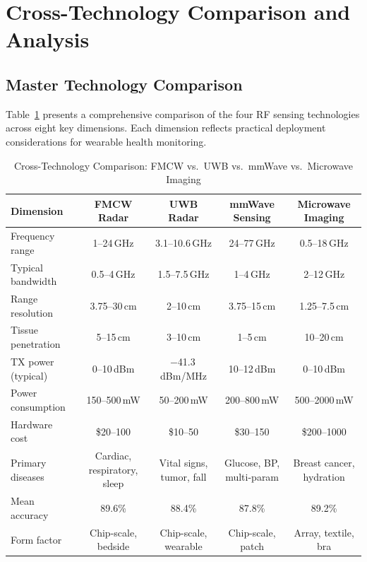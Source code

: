 \documentclass[journal,twoside]{IEEEtran}
\begin{document}
\section{Cross-Technology Comparison and Analysis}

\subsection{Master Technology Comparison}
Table~\ref{tab:master_comparison} presents a comprehensive comparison of the four RF sensing technologies across eight key dimensions. Each dimension reflects practical deployment considerations for wearable health monitoring.

\begin{table}[!t]
\centering
\caption{Cross-Technology Comparison: FMCW vs.\ UWB vs.\ mmWave vs.\ Microwave Imaging}
\label{tab:master_comparison}
\renewcommand{\arraystretch}{1.2}
\footnotesize
\begin{tabular}{lcccc}
\toprule
\textbf{Dimension} & \textbf{FMCW Radar} & \textbf{UWB Radar} & \textbf{mmWave Sensing} & \textbf{Microwave Imaging} \\
\midrule
Frequency range & 1--24\,GHz & 3.1--10.6\,GHz & 24--77\,GHz & 0.5--18\,GHz \\
Typical bandwidth & 0.5--4\,GHz & 1.5--7.5\,GHz & 1--4\,GHz & 2--12\,GHz \\
Range resolution & 3.75--30\,cm & 2--10\,cm & 3.75--15\,cm & 1.25--7.5\,cm \\
Tissue penetration & 5--15\,cm & 3--10\,cm & 1--5\,cm & 10--20\,cm \\
TX power (typical) & 0--10\,dBm & $-$41.3\,dBm/MHz & 10--12\,dBm & 0--10\,dBm \\
Power consumption & 150--500\,mW & 50--200\,mW & 200--800\,mW & 500--2000\,mW \\
Hardware cost & \$20--100 & \$10--50 & \$30--150 & \$200--1000 \\
Primary diseases & Cardiac, respiratory, sleep & Vital signs, tumor, fall & Glucose, BP, multi-param & Breast cancer, hydration \\
Mean accuracy & 89.6\% & 88.4\% & 87.8\% & 89.2\% \\
Form factor & Chip-scale, bedside & Chip-scale, wearable & Chip-scale, patch & Array, textile, bra \\
\bottomrule
\end{tabular}
\end{table}
\end{document}

